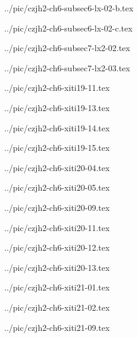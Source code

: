 ../pic/czjh2-ch6-subsec6-lx-02-b.tex



../pic/czjh2-ch6-subsec6-lx-02-c.tex



../pic/czjh2-ch6-subsec7-lx2-02.tex



../pic/czjh2-ch6-subsec7-lx2-03.tex



../pic/czjh2-ch6-xiti19-11.tex



../pic/czjh2-ch6-xiti19-13.tex



../pic/czjh2-ch6-xiti19-14.tex



../pic/czjh2-ch6-xiti19-15.tex



../pic/czjh2-ch6-xiti20-04.tex



../pic/czjh2-ch6-xiti20-05.tex



../pic/czjh2-ch6-xiti20-09.tex



../pic/czjh2-ch6-xiti20-11.tex



../pic/czjh2-ch6-xiti20-12.tex



../pic/czjh2-ch6-xiti20-13.tex



../pic/czjh2-ch6-xiti21-01.tex



../pic/czjh2-ch6-xiti21-02.tex



../pic/czjh2-ch6-xiti21-09.tex



